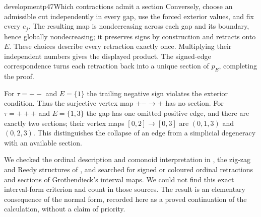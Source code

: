 \begin{dcomment}{development}{p47}{Which contractions admit a section}
Conversely, choose an admissible cut independently in every gap, use the forced exterior values, and fix every $e_j$. The resulting map is nondecreasing across each gap and its boundary, hence globally nondecreasing; it preserves signs by construction and retracts onto $E$. These choices describe every retraction exactly once. Multiplying their independent numbers gives the displayed product. The signed-edge correspondence turns each retraction back into a unique section of $p_E$, completing the proof.

For $\tau=+-$ and $E=\{1\}$ the trailing negative sign violates the exterior condition. Thus the surjective vertex map $+ -\to+$ has no section. For $\tau=+++$ and $E=\{1,3\}$ the gap has one omitted positive edge, and there are exactly two sections; their vertex maps $[0,2]\to[0,3]$ are $(0,1,3)$ and $(0,2,3)$. This distinguishes the collapse of an edge from a simplicial degeneracy with an available section.

We checked the ordinal description and comonoid interpretation in \citet[Appendix~D]{AguiarMahajan2010}, the zig-zag and Reedy structures of \citet[Definition~1.1 and Example~4.12]{ArakawaCnossen2026}, and searched for signed or coloured ordinal retractions and sections of Grothendieck's interval maps. We could not find this exact interval-form criterion and count in those sources. The result is an elementary consequence of the normal form, recorded here as a proved continuation of the calculation, without a claim of priority.
\end{dcomment}

